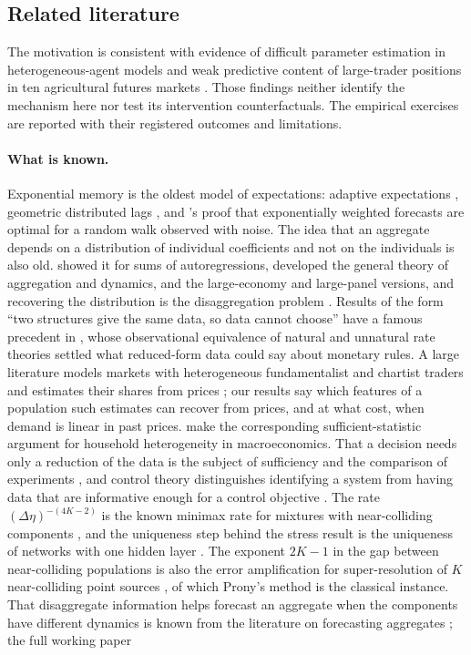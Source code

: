\documentclass[12pt]{article}
\theoremstyle{definition}
\theoremstyle{remark}
\begin{document}
\subsection{Related literature}\label{n:lit}

The motivation is consistent with evidence of difficult parameter estimation in heterogeneous-agent models \citep{lux2018} and weak predictive content of large-trader positions in ten agricultural futures markets \citep{sanders2009}. Those findings neither identify the mechanism here nor test its intervention counterfactuals. The empirical exercises are reported with their registered outcomes and limitations.

\paragraph{What is known.} Exponential memory is the oldest model of expectations: adaptive expectations \citep{cagan1956,nerlove1958}, geometric distributed lags \citep{koyck1954}, and \citet{muth1960}'s proof that exponentially weighted forecasts are optimal for a random walk observed with noise. The idea that an aggregate depends on a distribution of individual coefficients and not on the individuals is also old. \citet{granger1980} showed it for sums of autoregressions, \citet{forni1997} developed the general theory of aggregation and dynamics, \citet{zaffaroni2004} and \citet{pesaran2014} the large-economy and large-panel versions, and recovering the distribution is the disaggregation problem \citep{celov2008}. Results of the form ``two structures give the same data, so data cannot choose'' have a famous precedent in \citet{sargent1976}, whose observational equivalence of natural and unnatural rate theories settled what reduced-form data could say about monetary rules. A large literature models markets with heterogeneous fundamentalist and chartist traders \citep{brock1998,hommes2006} and estimates their shares from prices \citep{boswijk2007,franke2012,lux2018}; our results say which features of a population such estimates can recover from prices, and at what cost, when demand is linear in past prices. \citet{auclert2024} make the corresponding sufficient-statistic argument for household heterogeneity in macroeconomics. That a decision needs only a reduction of the data is the subject of sufficiency and the comparison of experiments \citep{blackwell1953,lecam1964}, and control theory distinguishes identifying a system from having data that are informative enough for a control objective \citep{vanwaarde2020}. The rate $(\Delta\eta)^{-(4K-2)}$ is the known minimax rate for mixtures with near-colliding components \citep{heinrich2018,wu2020}, and the uniqueness step behind the stress result is the uniqueness of networks with one hidden layer \citep{sussmann1992}. The exponent $2K-1$ in the gap between near-colliding populations is also the error amplification for super-resolution of $K$ near-colliding point sources \citep{batenkov2021}, of which Prony's method is the classical instance. That disaggregate information helps forecast an aggregate when the components have different dynamics is known from the literature on forecasting aggregates \citep{lutkepohl1987,hendry2011}; the full working paper 
\end{document}
